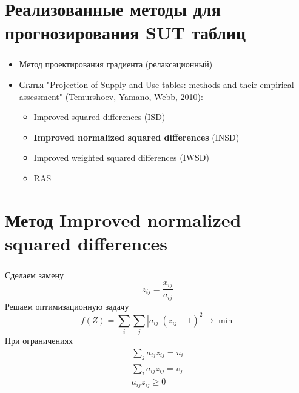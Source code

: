 \documentclass{beamer}
\begin{document}
\section{Реализованные методы для прогнозирования SUT таблиц}
\begin{frame}
	\frametitle{\insertsection}
	
	\begin{itemize}
	\item Метод проектирования градиента (релаксационный)
	\item Статья "Projection of Supply and Use tables: methods and their empirical assessment" (Temurshoev, Yamano, Webb, 2010):
	\begin{itemize}
    	\item Improved squared differences (ISD)
    	\item \textbf{Improved normalized squared differences} (INSD)
    	\item Improved weighted squared differences (IWSD)
    	\item RAS
	\end{itemize}
	\end{itemize}
	
\end{frame}

\section{Метод Improved normalized squared differences}
\begin{frame}
	\frametitle{\insertsection}
	Сделаем замену
	$$z_{ij} = \frac{x_{ij}}{a_{ij}}$$
	Решаем оптимизационную задачу
	$$f(Z) = \sum_i \sum_j |a_{ij}|(z_{ij}-1)^2 \to \min$$
	При ограничениях
	$$\begin{matrix}
	\sum_j a_{ij}z_{ij} = u_{i} \\
	\sum_i a_{ij}z_{ij} = v_{j} \\
	a_{ij}z_{ij} \geq 0 \\
	\end{matrix}$$
	
\end{frame}
\end{document}
